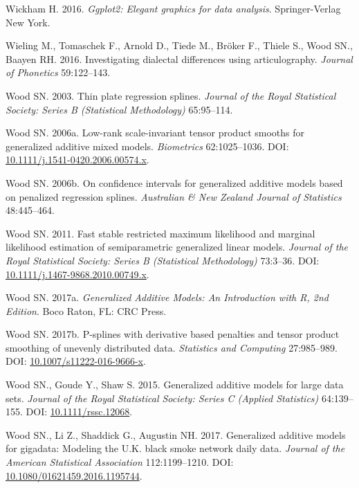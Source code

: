 \documentclass[12pt]{article}
\begin{document}
\hypertarget{ref-wickham_ggplot2_2016}{}
Wickham H. 2016. \emph{Ggplot2: Elegant graphics for data analysis}.
Springer-Verlag New York.

\hypertarget{ref-wieling_investigating_2016}{}
Wieling M., Tomaschek F., Arnold D., Tiede M., Bröker F., Thiele S.,
Wood SN., Baayen RH. 2016. Investigating dialectal differences using
articulography. \emph{Journal of Phonetics} 59:122--143.

\hypertarget{ref-wood_thin_2003}{}
Wood SN. 2003. Thin plate regression splines. \emph{Journal of the Royal
Statistical Society: Series B (Statistical Methodology)} 65:95--114.

\hypertarget{ref-wood_lowrank_2006}{}
Wood SN. 2006a. Low-rank scale-invariant tensor product smooths for
generalized additive mixed models. \emph{Biometrics} 62:1025--1036. DOI:
\href{https://doi.org/10.1111/j.1541-0420.2006.00574.x}{10.1111/j.1541-0420.2006.00574.x}.

\hypertarget{ref-wood_confidence_2006}{}
Wood SN. 2006b. On confidence intervals for generalized additive models
based on penalized regression splines. \emph{Australian \& New Zealand
Journal of Statistics} 48:445--464.

\hypertarget{ref-wood_fast_2011}{}
Wood SN. 2011. Fast stable restricted maximum likelihood and marginal
likelihood estimation of semiparametric generalized linear models.
\emph{Journal of the Royal Statistical Society: Series B (Statistical
Methodology)} 73:3--36. DOI:
\href{https://doi.org/10.1111/j.1467-9868.2010.00749.x}{10.1111/j.1467-9868.2010.00749.x}.

\hypertarget{ref-wood_generalized_2017}{}
Wood SN. 2017a. \emph{Generalized Additive Models: An Introduction with
R, 2nd Edition}. Boco Raton, FL: CRC Press.

\hypertarget{ref-wood_p_splines_2017}{}
Wood SN. 2017b. P-splines with derivative based penalties and tensor
product smoothing of unevenly distributed data. \emph{Statistics and
Computing} 27:985--989. DOI:
\href{https://doi.org/10.1007/s11222-016-9666-x}{10.1007/s11222-016-9666-x}.

\hypertarget{ref-wood_generalized_2015}{}
Wood SN., Goude Y., Shaw S. 2015. Generalized additive models for large
data sets. \emph{Journal of the Royal Statistical Society: Series C
(Applied Statistics)} 64:139--155. DOI:
\href{https://doi.org/10.1111/rssc.12068}{10.1111/rssc.12068}.

\hypertarget{ref-Wood2017-iy}{}
Wood SN., Li Z., Shaddick G., Augustin NH. 2017. Generalized additive
models for gigadata: Modeling the U.K. black smoke network daily data.
\emph{Journal of the American Statistical Association} 112:1199--1210.
DOI:
\href{https://doi.org/10.1080/01621459.2016.1195744}{10.1080/01621459.2016.1195744}.
\end{document}
